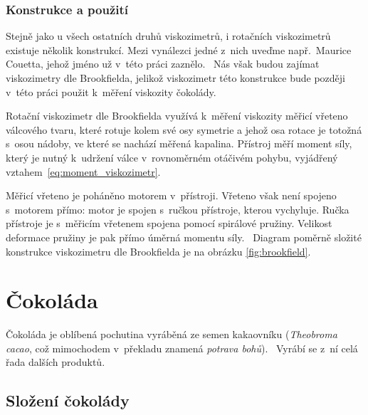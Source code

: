 \documentclass[12pt]{article}
\begin{document}
\subsubsection{Konstrukce a použití}

Stejně jako u všech ostatních druhů viskozimetrů, i rotačních viskozimetrů existuje několik konstrukcí. Mezi vynálezci jedné z~nich uveďme např.~Maurice Couetta, jehož jméno už v~této práci zaznělo.~\cite{wiki:Maurice_Couette} Nás však budou zajímat viskozimetry dle Brookfielda, jelikož viskozimetr této konstrukce bude později v~této práci použit k~měření viskozity čokolády.
\par\noindent
Rotační viskozimetr dle Brookfielda využívá k~měření viskozity měřicí vřeteno válcového tvaru, které rotuje kolem své osy symetrie a jehož osa rotace je totožná s~osou nádoby, ve které se nachází měřená kapalina. Přístroj měří moment síly, který je nutný k~udržení válce v~rovnoměrném otáčivém pohybu, vyjádřený vztahem~\ref{eq:moment_viskozimetr}.
\par\noindent
Měřicí vřeteno je poháněno motorem v~přístroji. Vřeteno však není spojeno s~motorem přímo: motor je spojen s~ručkou přístroje, kterou vychyluje. Ručka přístroje je s~měřicím vřetenem spojena pomocí spirálové pružiny. Velikost deformace pružiny je pak přímo úměrná momentu síly.~\cite{man:brookfield} Diagram poměrně složité konstrukce viskozimetru dle Brookfielda je na obrázku \ref{fig:brookfield}.

\newpage%
\section{Čokoláda}%

Čokoláda je oblíbená pochutina vyráběná ze semen kakaovníku (\emph{Theobroma cacao}, což mimochodem v~překladu znamená \emph{potrava bohů}).~\cite{wiki:Kakao} Vyrábí se z~ní celá řada dalších produktů.

\subsection{Složení čokolády}%
\label{sec:složení_čokolády}%
\end{document}
